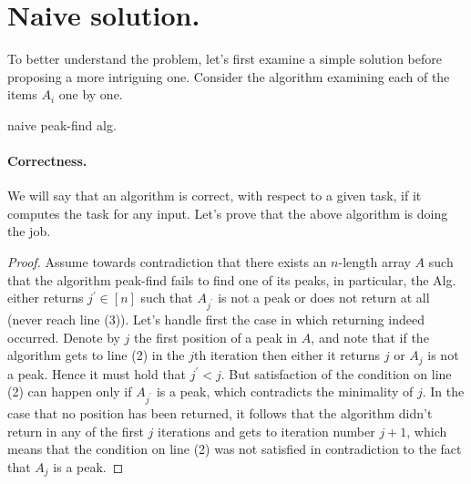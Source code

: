 \section{Naive solution.}
To better understand the problem, let's first examine a simple solution before proposing a more intriguing one. Consider the algorithm examining each of the items $A_{i}$ one by one.
\begin{algorithm}
\caption{naive peak-find alg.}
  { 
    } 
\end{algorithm}
\paragraph{Correctness.}
We will say that an algorithm is correct, with respect to a given task, if it computes the task for any input. Let's prove that the above algorithm is doing the job. 

\begin{proof}
%
%
Assume towards contradiction that there exists an $n$-length array $A$ such that the algorithm peak-find fails to find one of its peaks, in particular, the Alg. either returns $j^{\prime}\in [n]$ such that $A_{j^{\prime}}$ is not a peak or does not return at all (never reach line (3)). Let's handle first the case in which returning indeed occurred. Denote by $j$ the first position of a peak in $A$, and note that if the algorithm gets to line (2) in the $j$th iteration then either it returns $j$ or $A_{j}$ is not a peak.
  Hence it must hold that $j^{\prime} < j$. But satisfaction of the condition on line (2) can happen only if $A_{j^{\prime}}$ is a peak, which contradicts the minimality of $j$. In the case that no position has been returned, it follows that the algorithm didn't return in any of the first $j$ iterations and gets to iteration number $j+1$, which means that the condition on line (2) was not satisfied in contradiction to the fact that $A_{j}$ is a peak.
\end{proof}

